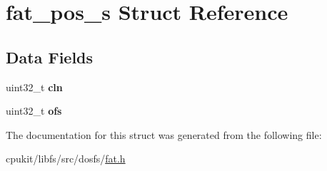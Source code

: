\hypertarget{structfat__pos__s}{}\section{fat\+\_\+pos\+\_\+s Struct Reference}
\label{structfat__pos__s}
\subsection*{Data Fields}
\begin{DoxyCompactItemize}
\item 
\mbox{\label{structfat__pos__s_a33592d22665650c6fb4e4177e2290749}} 
uint32\+\_\+t {\bfseries cln}
\item 
\mbox{\label{structfat__pos__s_ae5244db34a839929bc2d3bcbb2934dd6}} 
uint32\+\_\+t {\bfseries ofs}
\end{DoxyCompactItemize}


The documentation for this struct was generated from the following file\+:\begin{DoxyCompactItemize}
\item 
cpukit/libfs/src/dosfs/\mbox{\hyperlink{fat_8h}{fat.\+h}}\end{DoxyCompactItemize}
